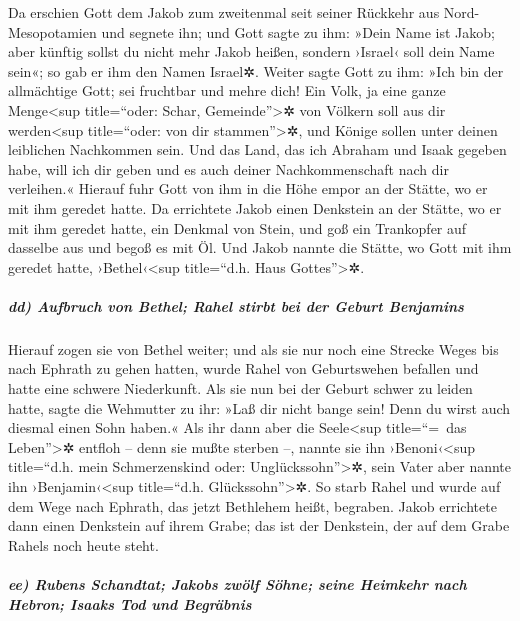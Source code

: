  Da erschien Gott dem Jakob zum zweitenmal seit seiner
Rückkehr aus Nord-Mesopotamien und segnete ihn;  und Gott
sagte zu ihm: »Dein Name ist Jakob; aber künftig sollst du nicht mehr
Jakob heißen, sondern ›Israel‹ soll dein Name sein«; so gab er ihm den
Namen Israel✲.  Weiter sagte Gott zu ihm: »Ich bin der
allmächtige Gott; sei fruchtbar und mehre dich! Ein Volk, ja eine ganze
Menge\textless sup title=``oder: Schar, Gemeinde''\textgreater✲ von
Völkern soll aus dir werden\textless sup title=``oder: von dir
stammen''\textgreater✲, und Könige sollen unter deinen leiblichen
Nachkommen sein.  Und das Land, das ich Abraham und Isaak
gegeben habe, will ich dir geben und es auch deiner Nachkommenschaft
nach dir verleihen.«  Hierauf fuhr Gott von ihm in die
Höhe empor an der Stätte, wo er mit ihm geredet hatte. 
Da errichtete Jakob einen Denkstein an der Stätte, wo er mit ihm geredet
hatte, ein Denkmal von Stein, und goß ein Trankopfer auf dasselbe aus
und begoß es mit Öl.  Und Jakob nannte die Stätte, wo
Gott mit ihm geredet hatte, ›Bethel‹\textless sup title=``d.h. Haus
Gottes''\textgreater✲.

\hypertarget{dd-aufbruch-von-bethel-rahel-stirbt-bei-der-geburt-benjamins}{%
\subparagraph{dd) Aufbruch von Bethel; Rahel stirbt bei der Geburt
Benjamins}\label{dd-aufbruch-von-bethel-rahel-stirbt-bei-der-geburt-benjamins}}

 Hierauf zogen sie von Bethel weiter; und als sie nur
noch eine Strecke Weges bis nach Ephrath zu gehen hatten, wurde Rahel
von Geburtswehen befallen und hatte eine schwere Niederkunft.
 Als sie nun bei der Geburt schwer zu leiden hatte, sagte
die Wehmutter zu ihr: »Laß dir nicht bange sein! Denn du wirst auch
diesmal einen Sohn haben.«  Als ihr dann aber die
Seele\textless sup title=``=~das Leben''\textgreater✲ entfloh -- denn
sie mußte sterben --, nannte sie ihn ›Benoni‹\textless sup title=``d.h.
mein Schmerzenskind oder: Unglückssohn''\textgreater✲, sein Vater aber
nannte ihn ›Benjamin‹\textless sup title=``d.h.
Glückssohn''\textgreater✲.  So starb Rahel und wurde auf
dem Wege nach Ephrath, das jetzt Bethlehem heißt, begraben.
 Jakob errichtete dann einen Denkstein auf ihrem Grabe;
das ist der Denkstein, der auf dem Grabe Rahels noch heute steht.

\hypertarget{ee-rubens-schandtat-jakobs-zwuxf6lf-suxf6hne-seine-heimkehr-nach-hebron-isaaks-tod-und-begruxe4bnis}{%
\subparagraph{ee) Rubens Schandtat; Jakobs zwölf Söhne; seine Heimkehr
nach Hebron; Isaaks Tod und
Begräbnis}\label{ee-rubens-schandtat-jakobs-zwuxf6lf-suxf6hne-seine-heimkehr-nach-hebron-isaaks-tod-und-begruxe4bnis}}

